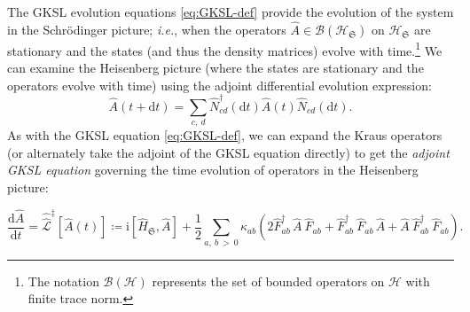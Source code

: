 \documentclass[preprints,article,accept,moreauthors,pdftex]{Definitions/mdpi}
\begin{document}
\begin{paracol}{2}
The GKSL evolution equations \eqref{eq:GKSL-def} provide the evolution of the system in the Schrödinger picture; \emph{i.e.}, when the operators $\widehat{A}\in\mathcal{B}\left(\mathcal{H}_{\mathfrak{S}}\right)$ on $\mathcal{H}_{\mathfrak{S}}$ are stationary and the states (and thus the density matrices) evolve with time.\footnote{The notation $\mathcal{B}(\mathcal{H})$ represents the set of bounded operators on $\mathcal{H}$ with finite trace norm.} We can examine the Heisenberg picture (where the states are stationary and the operators evolve with time) using the adjoint differential evolution expression:
\begin{equation}
    \label{eq:Markov-dynamics-Kraus-rep-Heis}
    \widehat{A}\left(t+\mathrm{d}t\right) = \sum_{c,\:d}\widehat{N}_{cd}^{\dagger}\left(\mathrm{d}t\right)\widehat{A}\left(t\right)\widehat{N}_{cd}\left(\mathrm{d}t\right).
\end{equation}
As with the GKSL equation \eqref{eq:GKSL-def}, we can expand the Kraus operators (or alternately take the adjoint of the GKSL equation directly) to get the \emph{adjoint GKSL equation} governing the time evolution of operators in the Heisenberg picture:
\end{paracol}
\begin{equation}
    \label{eq:GKSL-adj-def}
    \frac{\mathrm{d}\widehat{A}}{\mathrm{d}t} = \hat{\hat{\mathcal{L}}}^{\ddagger}\left[\widehat{A}\left(t\right)\right] \coloneqq \mathrm{i}\left[\widehat{H}_{\mathfrak{S}},\widehat{A}\right] + \frac{1}{2}\sum_{a,\:b\:>\:0}\kappa_{ab}\left(2\widehat{F}_{ab}^{\dagger}\,\widehat{A}\:\!\widehat{F}_{ab} + \widehat{F}_{ab}^{\dagger}\:\!\widehat{F}_{ab}\,\widehat{A} + \widehat{A}\:\!\widehat{F}_{ab}^{\dagger}\:\!\widehat{F}_{ab}\right).
\end{equation}
\end{document}
